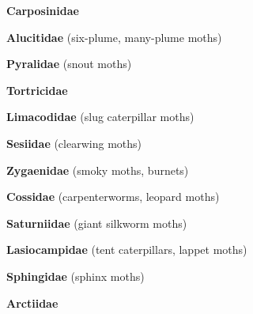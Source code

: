 \documentclass[letterpaper,10pt]{article}
\begin{document}
{\makebox[0.6cm]{}  \textbf{Carposinidae} \par
\makebox[0.6cm]{}  \textbf{Alucitidae} (six-plume, many-plume moths) \par
\makebox[0.6cm]{}  \textbf{Pyralidae} (snout moths) \par
\makebox[0.6cm]{}  \textbf{Tortricidae} \par
\makebox[0.6cm]{}  \textbf{Limacodidae} (slug caterpillar moths) \par
\makebox[0.6cm]{}  \textbf{Sesiidae} (clearwing moths) \par
\makebox[0.6cm]{}  \textbf{Zygaenidae} (smoky moths, burnets) \par
\makebox[0.6cm]{}  \textbf{Cossidae} (carpenterworms, leopard moths) \par
\makebox[0.6cm]{}  \textbf{Saturniidae} (giant silkworm moths) \par
\makebox[0.6cm]{}  \textbf{Lasiocampidae} (tent caterpillars, lappet moths) \par
\makebox[0.6cm]{}  \textbf{Sphingidae} (sphinx moths) \par
\makebox[0.6cm]{}  \textbf{Arctiidae} \par
}
\end{document}
